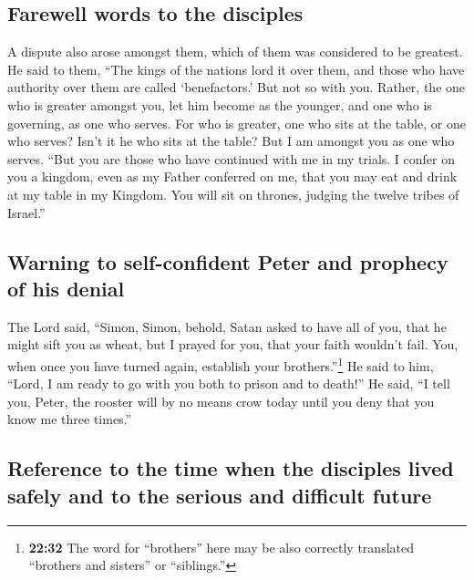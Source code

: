 \hypertarget{farewell-words-to-the-disciples}{%
\subsection{Farewell words to the
disciples}\label{farewell-words-to-the-disciples}}

 A dispute also arose amongst them, which of them was
considered to be greatest.  He said to them, ``The kings
of the nations lord it over them, and those who have authority over them
are called `benefactors.'  But not so with you. Rather,
the one who is greater amongst you, let him become as the younger, and
one who is governing, as one who serves.  For who is
greater, one who sits at the table, or one who serves? Isn't it he who
sits at the table? But I am amongst you as one who serves.
 ``But you are those who have continued with me in my
trials.  I confer on you a kingdom, even as my Father
conferred on me,  that you may eat and drink at my table
in my Kingdom. You will sit on thrones, judging the twelve tribes of
Israel.''

\hypertarget{warning-to-self-confident-peter-and-prophecy-of-his-denial}{%
\subsection{Warning to self-confident Peter and prophecy of his
denial}\label{warning-to-self-confident-peter-and-prophecy-of-his-denial}}

 The Lord said, ``Simon, Simon, behold, Satan asked to
have all of you, that he might sift you as wheat,  but I
prayed for you, that your faith wouldn't fail. You, when once you have
turned again, establish your brothers.''\footnote{\textbf{22:32} The
  word for ``brothers'' here may be also correctly translated ``brothers
  and sisters'' or ``siblings.''}  He said to him,
``Lord, I am ready to go with you both to prison and to death!''
 He said, ``I tell you, Peter, the rooster will by no
means crow today until you deny that you know me three times.''

\hypertarget{reference-to-the-time-when-the-disciples-lived-safely-and-to-the-serious-and-difficult-future}{%
\subsection{Reference to the time when the disciples lived safely and to
the serious and difficult
future}\label{reference-to-the-time-when-the-disciples-lived-safely-and-to-the-serious-and-difficult-future}}

